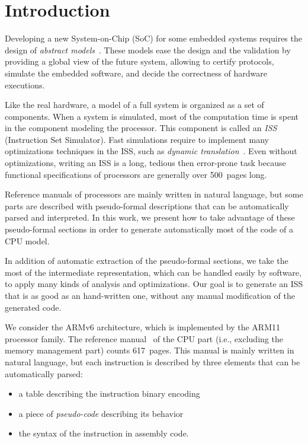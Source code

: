 \documentclass[conference]{ieeeconf}
\begin{document}
\section{Introduction}

Developing a new System-on-Chip (SoC) for some embedded systems requires the
design of {\em abstract models}~\cite{tlm-book}. These models ease the design
and the validation by providing a global view of the future system, allowing to
certify protocols, simulate the embedded software, and decide the correctness of
hardware executions.

Like the real hardware, a model of a full system is organized as a set of
components. When a system is simulated, most of the computation time is spent in
the component modeling the processor. This component is called an {\em ISS}
(Instruction Set Simulator). Fast simulations require to implement many
optimizations techniques in the ISS, such as {\em dynamic
  translation}~\cite{dyntrans}.  Even without optimizations, writing an ISS is a
long, tedious then error-prone task because functional specifications of processors
are generally over 500~pages long. %

Reference manuals of processors are mainly written in natural language, but some
parts are described with pseudo-formal descriptions that can be automatically
parsed and interpreted. In this work, we present how to take advantage of these
pseudo-formal sections in order to generate automatically most of the code of a
CPU model.

In addition of automatic extraction of the pseudo-formal sections, we take the
most of the intermediate representation, which can be handled easily by
software, to apply many kinds of analysis and optimizations. Our goal is to
generate an ISS that is as good as an hand-written one, without any manual
modification of the generated code.

We consider the ARMv6 architecture, which is implemented by the ARM11 processor
family. The reference manual~\cite{arm6refman} of the CPU part (i.e., excluding
the memory management part) counts 617~pages. This manual is mainly written in
natural language, but each instruction is described by three elements that can
be automatically parsed:
\begin{itemize}
\item a table describing the instruction binary encoding
\item a piece of {\em pseudo-code} describing its behavior
\item the syntax of the instruction in assembly code.
\end{itemize}
\end{document}
